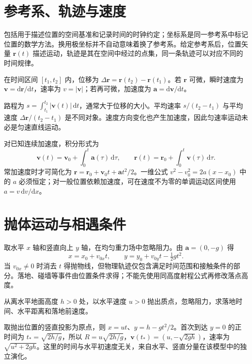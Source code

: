 \documentclass[UTF8,12pt,a4paper,fontset=fandol]{ctexbook}
\begin{document}
\section{参考系、轨迹与速度}
包括用于描述位置的空间基准和记录时间的时钟约定；坐标系是同一参考系中标记位置的数学方法。换用极坐标并不自动意味着换了参考系。给定参考系后，位置矢量 $\mathbf r(t)$ 描述运动，轨迹是其在空间中经过的点集，同一条轨迹可以对应不同的时间规律。

\begin{definition}[位移、速度与加速度]
在时间区间 $[t_1,t_2]$ 内，位移为 $\Delta\mathbf r=\mathbf r(t_2)-\mathbf r(t_1)$。若 $\mathbf r$ 可微，瞬时速度为 $\mathbf v=\mathrm d\mathbf r/\mathrm dt$，速率为 $v=|\mathbf v|$；若再可微，加速度为 $\mathbf a=\mathrm d\mathbf v/\mathrm dt$。
\end{definition}
路程为 $s=\int_{t_1}^{t_2}|\mathbf v(t)|\,\mathrm dt$，通常大于位移的大小。平均速率 $s/(t_2-t_1)$ 与平均速度 $\Delta\mathbf r/(t_2-t_1)$ 是不同对象。速度方向变化也产生加速度，因此匀速率运动未必是匀速直线运动。

对已知连续加速度，积分形式为
\begin{equation}
 \mathbf v(t)=\mathbf v_0+\int_0^t\mathbf a(\tau)\,\mathrm d\tau,\qquad
 \mathbf r(t)=\mathbf r_0+\int_0^t\mathbf v(\tau)\,\mathrm d\tau.
 \label{eq:mech-kinematic-integrals}
\end{equation}
常加速度时才可简化为 $\mathbf r=\mathbf r_0+\mathbf v_0t+\mathbf a t^2/2$。一维公式 $v^2-v_0^2=2a(x-x_0)$ 中的 $a$ 必须恒定；对一般位置依赖加速度，可在速度不为零的单调运动区间使用 $a=v\,\mathrm dv/\mathrm dx$。

\section{抛体运动与相遇条件}
取水平 $x$ 轴和竖直向上 $y$ 轴，在均匀重力场中忽略阻力。由 $\mathbf a=(0,-g)$ 得
\[
 x=x_0+v_{0x}t,\qquad y=y_0+v_{0y}t-\tfrac12gt^2.
\]
当 $v_{0x}\ne0$ 时消去 $t$ 得抛物线，但物理轨迹仅包含满足时间范围和接触条件的部分。落地、碰墙等事件由位置条件求得；不能先使用同高度射程公式再修改落点高度。

\begin{example}[从高处水平抛出]
从离水平地面高度 $h>0$ 处，以水平速度 $u>0$ 抛出质点，忽略阻力，求落地时间、水平距离和落地前速度。
\end{example}
\begin{solve}
取抛出位置的竖直投影为原点，则 $x=ut$、$y=h-gt^2/2$。首次到达 $y=0$ 的正时间为 $t_*=\sqrt{2h/g}$，所以 $R=u\sqrt{2h/g}$，$\mathbf v(t_*)=(u,-\sqrt{2gh})$，速率为 $\sqrt{u^2+2gh}$。这里的时间与水平初速度无关，来自水平、竖直分量在该模型中的独立演化。
\end{solve}
\end{document}
